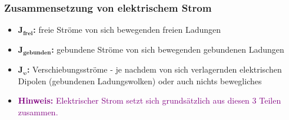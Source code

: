 \subsubsection{Zusammensetzung von elektrischem Strom}
	\begin{itemize}
	\item \textbf{$\mathbf{J_{frei}}$:} freie Ströme von sich bewegenden freien Ladungen
	\item \textbf{$\mathbf{J_{gebunden}}$:} gebundene Ströme von sich bewegenden gebundenen Ladungen
    \item \textbf{$\mathbf{J_{\upsilon}}$:} Verschiebungsströme - je nachdem von sich verlagernden elektrischen Dipolen (gebundenen Ladungswolken) oder auch nichts bewegliches
    \item \textcolor{purple}{\textbf{Hinweis:} Elektrischer Strom setzt sich grundsätzlich aus diesen 3 Teilen zusammen.}
\end{itemize} 

